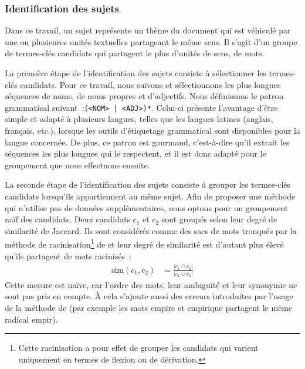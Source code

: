       \subsubsection{Identification des sujets}
      \label{subsubsec:main-automatic_keyphrase_annotation-unsupervised_automatic_keyphrase_extraction-topicrank-topic_identification}
        Dans ce travail, un sujet représente un thème du document qui est
        véhiculé par une ou plusieures unités textuelles partageant le même
        sens. Il s'agit d'un groupe de termes-clés candidats qui partagent le
        plus d'unités de sens, de mots.

        La première étape de l'identification des sujets consiste à sélectionner
        les termes-clés candidats.
        Pour ce travail, nous suivons  et
        sélectionnons les plus longues séquences de noms, de noms propres et
        d'adjectifs. Nous définissons le patron grammatical
        suivant~:\texttt{(<NOM> | <ADJ>)*}. Celui-ci présente l'avantage d'être simple
        et adapté à plusieurs langues, telles que les langues latines (anglais, français, etc.), lorsque les
        outils d'étiquetage grammatical sont disponibles pour la langue
        concernée. De plus, ce patron est gourmand, c'est-à-dire qu'il extrait
        les séquences les plus longues qui le respectent, et il est donc adapté
        pour le groupement que nous effectuons ensuite.

        La seconde étape de l'identification des sujets consiste à grouper les
        termes-clés candidats lorsqu'ils appartiennent au même sujet. Afin de
        proposer une méthode qui n'utilise pas de données
        supplémentaires, nous optons pour un groupement naïf des
        candidats. Deux candidats $c_1$ et $c_2$ sont groupés selon leur degré
        de similarité de Jaccard. Ils sont considérés comme des sacs de
        mots tronqués par la méthode de racinisation\footnote{Cette
        racinisation a pour effet de grouper les candidats qui varient
        uniquement en termes de flexion ou de dérivation.} de
         et leur degré de similarité est
        d'autant plus élevé qu'ils partagent de mots racinisés~:
        \begin{align}
          \text{sim}(c_1, c_2) &= \frac{|c_1 \cap c_2|}{|c_1 \cup c_2|} \label{equa:jaccard}
        \end{align}
        Cette mesure est naïve, car l'ordre des mots, leur ambiguïté
        et leur synonymie ne sont pas pris en compte. À cela s'ajoute
        aussi des erreurs introduites par l'usage de la méthode de
         (par exemple les mots
        \og{}empire\fg{} et \og{}empirique\fg{} partagent le même radical
        \og{}empir\fg{}).

